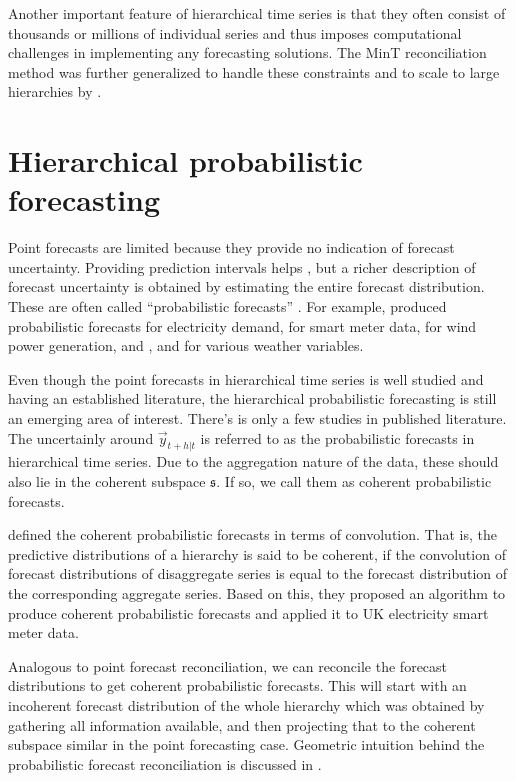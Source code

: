 \documentclass[graybox]{svmult}
\begin{document}
Another important feature of hierarchical time series is that they often consist of thousands or millions of individual series and thus imposes computational challenges in implementing any forecasting solutions. The MinT reconciliation method was further generalized to handle these constraints and to scale to large hierarchies by \cite{Wickramasuriya2018}.


\section{Hierarchical probabilistic forecasting}

Point forecasts are limited because they provide no indication of forecast uncertainty. Providing prediction intervals helps \citep{Shang2017a}, but a richer description of forecast uncertainty is obtained by estimating the entire forecast distribution. These are often called ``probabilistic forecasts'' \citep{Gneiting2014}. For example, \citet{McSharry2005} produced probabilistic forecasts for electricity demand, \citet{BenTaieb2017} for smart meter data, \citet{Pinson2009} for wind power generation, and \citet{Gel2004}, \citet{Gneiting2005a} and \citet{Gneiting2005} for various weather variables.

Even though the point forecasts in hierarchical time series is well studied and having an established literature, the hierarchical probabilistic forecasting is still an emerging area of interest. There's is only a few studies in published literature. The uncertainly around $\vec{y}_{t+h|t}$ is referred to as the probabilistic forecasts in hierarchical time series. Due to the aggregation nature of the data, these should also lie in the coherent subspace $\mathfrak{s}$. If so, we call them as coherent probabilistic forecasts.

\cite{Taieb2017} defined the coherent probabilistic forecasts in terms of convolution. That is, the predictive distributions of a hierarchy is said to be coherent, if the convolution of forecast distributions of disaggregate series is equal to the forecast distribution of the corresponding aggregate series. Based on this, they proposed an algorithm to produce coherent probabilistic forecasts and applied it to UK electricity smart meter data.

Analogous to point forecast reconciliation, we can reconcile the forecast distributions to get coherent probabilistic forecasts. This will start with an incoherent forecast distribution of the whole hierarchy which was obtained by gathering all information available, and then projecting that to the coherent subspace similar in the point forecasting case. Geometric intuition behind the probabilistic forecast reconciliation is discussed in \cite{Gamakumara2018}.
\end{document}
